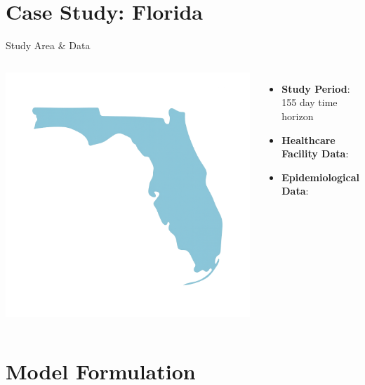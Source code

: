 \documentclass[aspectratio=169,xcolor=dvipsnames]{beamer}
\begin{document}
\section{Case Study: Florida}
\begin{frame}{Study Area \& Data}
    \begin{columns}[c]  %
        \centering
        \includegraphics[width=0.85\linewidth]{pics/florida.png}
  
        \begin{itemize} 
          \item \textbf{Study Period}: 155 day time horizon
          \item \textbf{Healthcare Facility Data}: \cite{covid19pvi2023}
          \item \textbf{Epidemiological Data}: \cite{abazari2024allocation, florida_covid19_hub2023, zheng2022real}
        \end{itemize}
    \end{columns}
  \end{frame}
  

\section{Model Formulation}
\end{document}
